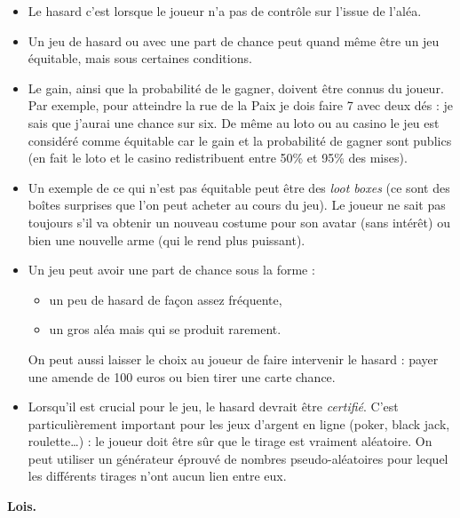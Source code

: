 \documentclass[11pt,class=report,crop=false]{standalone}
\begin{document}
\begin{itemize}
	\item Le hasard c'est lorsque le joueur n'a pas de contrôle sur l'issue de l'aléa.
	
	\item Un jeu de hasard ou avec une part de chance peut quand même être un jeu équitable, mais sous certaines conditions. 
	
	\item Le gain, ainsi que la probabilité de le gagner, doivent être connus du joueur. Par exemple, pour atteindre la rue de la Paix je dois faire 7 avec deux dés : je sais que j'aurai une chance sur six. De même au loto ou au casino le jeu est considéré comme équitable car le gain et la probabilité de gagner sont publics (en fait le loto et le casino redistribuent entre 50\% et 95\% des mises).
	
	\item Un exemple de ce qui n'est pas équitable peut être des \emph{loot boxes} (ce sont des boîtes surprises que l'on peut acheter au cours du jeu). Le joueur ne sait pas toujours s'il va obtenir un nouveau costume pour son avatar (sans intérêt) ou bien une nouvelle arme (qui le rend plus puissant).
	
	\item Un jeu peut avoir une part de chance sous la forme :
	\begin{itemize}
		\item un peu de hasard de façon assez fréquente,
		\item un gros aléa mais qui se produit rarement.
	\end{itemize}
On peut aussi laisser le choix au joueur de faire intervenir le hasard : \og{}payer une amende de 100 euros ou bien tirer une carte chance\fg{}.
	
	\item Lorsqu'il est crucial pour le jeu, le hasard devrait être \emph{certifié}.
	C'est particulièrement important pour les jeux d'argent en ligne (poker, black jack, roulette\ldots) : le joueur doit être sûr que le tirage est vraiment aléatoire. On peut utiliser un générateur éprouvé de nombres pseudo-aléatoires pour lequel les différents tirages n'ont aucun lien entre eux.
	
\end{itemize}

\bigskip
\textbf{Lois.}
\end{document}
